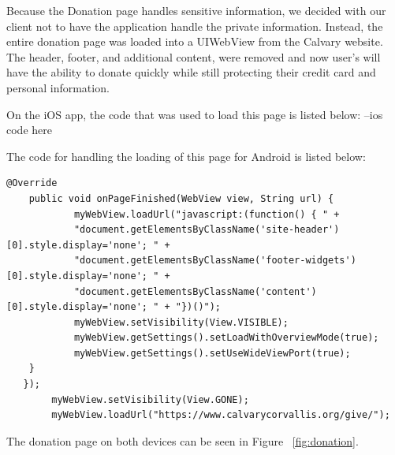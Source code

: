 \documentclass[letterpaper,10pt,draftclsnofoot,onecolumn,titlepage]{IEEEtran}
\begin{document}
		Because the Donation page handles sensitive information, we decided with our client not to have the application handle the private information.
		Instead, the entire donation page was loaded into a UIWebView from the Calvary website.
		The header, footer, and additional content, were removed and now user's will have the ability to donate quickly while still protecting their credit card and personal information.

		On the iOS app, the code that was used to load this page is listed below:
		--ios code here


		The code for handling the loading of this page for Android is listed below:
		\begin{lstlisting}
@Override
    public void onPageFinished(WebView view, String url) {
            myWebView.loadUrl("javascript:(function() { " +
            "document.getElementsByClassName('site-header')[0].style.display='none'; " +
            "document.getElementsByClassName('footer-widgets')[0].style.display='none'; " +
            "document.getElementsByClassName('content')[0].style.display='none'; " + "})()");
            myWebView.setVisibility(View.VISIBLE);
            myWebView.getSettings().setLoadWithOverviewMode(true);
            myWebView.getSettings().setUseWideViewPort(true);
   	}
   });
        myWebView.setVisibility(View.GONE);
        myWebView.loadUrl("https://www.calvarycorvallis.org/give/");
        		\end{lstlisting}

		The donation page on both devices can be seen in Figure ~\ref{fig:donation}.
\end{document}
